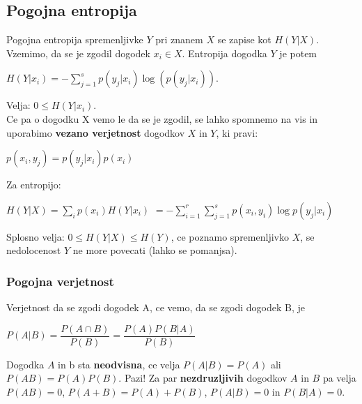 \documentclass{article}
\begin{document}
\begin{multicols}{2}
	\subsection{Pogojna entropija}
	Pogojna entropija spremenljivke $Y$ pri znanem $X$ se zapise kot $H(Y|X)$.
	Vzemimo, da se je zgodil dogodek $x_i \in X$. Entropija dogodka $Y$ je potem
	\begin{center}
		\begin{math}
			H(Y|x_i) = - \sum_{j=1}^s p(y_j|x_i) \log(p(y_j| x_i)).
		\end{math}
	\end{center}
	Velja: $0 \leq H(Y| x_i)$.\\
	Ce pa o dogodku X vemo le da se je zgodil, se lahko spomnemo na vis in uporabimo
	\textbf{vezano verjetnost} dogodkov $X$ in $Y$, ki pravi:
	\begin{center}
		\begin{math}
			p(x_i, y_j) = p(y_j|x_i)p(x_i)
		\end{math}
	\end{center}
	Za entropijo:
	\begin{center}
		\begin{math}
			H(Y|X) = \sum_{i} p(x_i)H(Y|x_i)
		\end{math}
		\begin{math}
			= -\sum_{i=1}^r \sum_{j=1}^s p(x_i, y_i) \log p(y_j | x_i)
		\end{math}
	\end{center}
	Splosno velja: $0 \leq H(Y|X) \leq H(Y)$, ce poznamo spremenljivko $X$, se nedolocenost $Y$ ne more povecati (lahko se pomanjsa).

	\subsubsection{Pogojna verjetnost}
	Verjetnost da se zgodi dogodek A, ce vemo, da se zgodi dogodek B, je
	\begin{center}
		\begin{math}
			P(A | B) = \dfrac{P(A \cap B)}{P(B)} = \dfrac{P(A)P(B|A)}{P(B)}
		\end{math}
	\end{center}
	Dogodka $A$ in b sta \textbf{neodvisna}, ce velja $P(A | B) = P(A)$ ali
	$P(A B) = P(A)P(B)$.
	Pazi! Za par \textbf{nezdruzljivih} dogodkov $A$ in $B$
	pa velja $P(AB) = 0$,  $P(A + B) = P(A) + P(B)$, $P(A|B) = 0$ in $P(B|A) = 0$.


\end{multicols}
\end{document}
